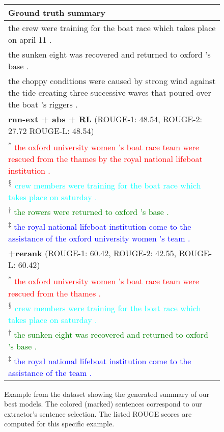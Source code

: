 \documentclass[11pt,a4paper]{article}
\begin{document}
\begin{figure*}[t]
\begin{tabular*}{\textwidth}{| p{} | }
  \\ \hline
  \textbf{Ground truth summary} \\ \hline
the crew were training for the boat race which takes place on april 11 . \\
the sunken eight was recovered and returned to oxford 's base . \\
the choppy conditions were caused by strong wind against the tide creating three successive waves that poured over the boat 's riggers . \\
  \hline
  \textbf{rnn-ext + abs + RL} (ROUGE-1: 48.54, ROUGE-2: 27.72 ROUGE-L: 48.54)\\ \hline
  \textsuperscript{*}\textcolor{red}{
the oxford university women 's boat race team were rescued from the thames by the royal national lifeboat institution .} \\
\textsuperscript{$\mathsection$}\textcolor{cyan}{
crew members were training for the boat race which takes place on saturday .
} \\
\textsuperscript{$\dagger$}\textcolor{green}{
the rowers were returned to oxford 's base .
} \\
\textsuperscript{$\ddagger$}\textcolor{blue}{
the royal national lifeboat institution come to the assistance of the oxford university women 's team .
} \\ \hline
  \textbf{+rerank} (ROUGE-1: 60.42, ROUGE-2: 42.55, ROUGE-L: 60.42)\\ \hline
  \textsuperscript{*}\textcolor{red}{
the oxford university women 's boat race team were rescued from the thames .
  } \\
\textsuperscript{$\mathsection$}\textcolor{cyan}{
crew members were training for the boat race which takes place on saturday .
} \\
\textsuperscript{$\dagger$}\textcolor{green}{
the sunken eight was recovered and returned to oxford 's base .
} \\
\textsuperscript{$\ddagger$}\textcolor{blue}{
the royal national lifeboat institution come to the assistance of the team .
} \\
  \hline
\end{tabular*}
\caption{
Example from the dataset showing the generated summary of our best models. 
The colored (marked) sentences correspond to our extractor's sentence selection.
The listed ROUGE scores are computed for this specific example.
}
\label{fig:sample1}
\end{figure*}
 
\end{document}
